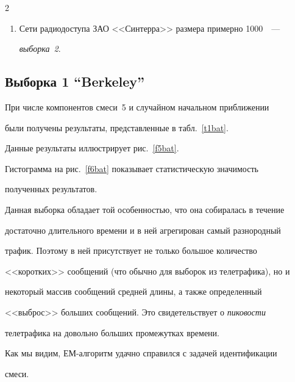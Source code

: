 \begin{multicols}{2}
\begin{enumerate}[I]
\item


Сети радиодоступа ЗАО <<Синтерра>> размера примерно 1000~\cite{9bat}~---


 \textit{выборка~2}.


\end{enumerate}





\subsection{Выборка 1 ``Berkeley''} %





При числе компонентов смеси~5 и случайном начальном приближении


были получены результаты, представленные в табл.~\ref{t1bat}.








Данные результаты иллюстрирует рис.~\ref{f5bat}.





Гистограмма  на рис.~\ref{f6bat} показывает статистическую значимость


полученных результатов.





Данная выборка обладает той особенностью, что она собиралась в течение


достаточно длительного времени и в ней агрегирован самый разнородный


трафик. Поэтому в ней присутствует не только большое количество


<<коротких>> сообщений (что обычно для выборок из телетрафика), но и


некоторый массив сообщений средней длины, а также определенный


<<выброс>> больших сообщений. Это свидетельствует о \textit{пиковости}


телетрафика на довольно больших промежутках времени.





Как мы видим, ЕМ-алгоритм удачно справился с задачей идентификации


смеси.






\end{multicols}
